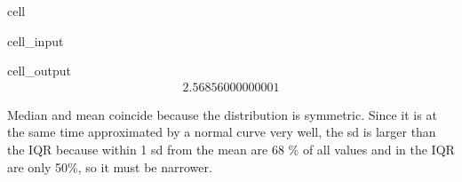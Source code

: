 \documentclass[letterpaper,10pt,english]{jupyterBook}
\begin{document}
\begin{sphinxuseclass}{cell}\begin{sphinxVerbatimInput}

\begin{sphinxuseclass}{cell_input}
\begin{sphinxVerbatim}[commandchars=\\\{\}]
\end{sphinxVerbatim}

\end{sphinxuseclass}\end{sphinxVerbatimInput}
\begin{sphinxVerbatimOutput}

\begin{sphinxuseclass}{cell_output}\begin{equation*}
\begin{split}2.56856000000001\end{split}
\end{equation*}
\end{sphinxuseclass}\end{sphinxVerbatimOutput}

\end{sphinxuseclass}
\sphinxAtStartPar
Median and mean coincide because the distribution is symmetric. Since it is at the same time approximated by a normal curve very well, the sd is larger than the IQR because within 1 sd from the mean are 68 \% of all values and in the IQR are only 50\%, so it must be narrower.
\end{document}
